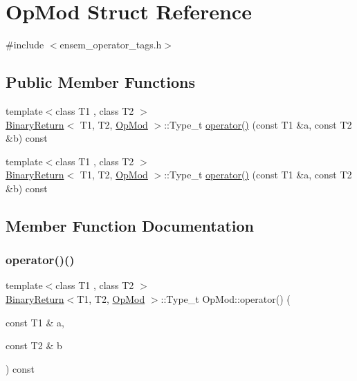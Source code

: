 \hypertarget{structOpMod}{}\section{Op\+Mod Struct Reference}
\label{structOpMod}


{\ttfamily \#include $<$ensem\+\_\+operator\+\_\+tags.\+h$>$}

\subsection*{Public Member Functions}
\begin{DoxyCompactItemize}
\item 
{\footnotesize template$<$class T1 , class T2 $>$ }\\\mbox{\hyperlink{structBinaryReturn}{Binary\+Return}}$<$ T1, T2, \mbox{\hyperlink{structOpMod}{Op\+Mod}} $>$\+::Type\+\_\+t \mbox{\hyperlink{structOpMod_a76039bd668de4b56b48f8d9c64bebce4}{operator()}} (const T1 \&a, const T2 \&b) const
\item 
{\footnotesize template$<$class T1 , class T2 $>$ }\\\mbox{\hyperlink{structBinaryReturn}{Binary\+Return}}$<$ T1, T2, \mbox{\hyperlink{structOpMod}{Op\+Mod}} $>$\+::Type\+\_\+t \mbox{\hyperlink{structOpMod_a76039bd668de4b56b48f8d9c64bebce4}{operator()}} (const T1 \&a, const T2 \&b) const
\end{DoxyCompactItemize}


\subsection{Member Function Documentation}
\mbox{\label{structOpMod_a76039bd668de4b56b48f8d9c64bebce4}} 
\subsubsection{\texorpdfstring{operator()()}{operator()()}\hspace{0.1cm}{\footnotesize\ttfamily [1/2]}}
{\footnotesize\ttfamily template$<$class T1 , class T2 $>$ \\
\mbox{\hyperlink{structBinaryReturn}{Binary\+Return}}$<$T1, T2, \mbox{\hyperlink{structOpMod}{Op\+Mod}} $>$\+::Type\+\_\+t Op\+Mod\+::operator() (\begin{DoxyParamCaption}\item[{const T1 \&}]{a,  }\item[{const T2 \&}]{b }\end{DoxyParamCaption}) const\hspace{0.3cm}{\ttfamily [inline]}}

